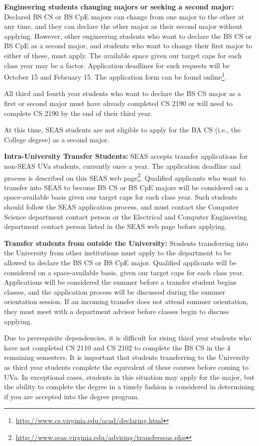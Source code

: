 \documentclass[10pt,letter,twocolumn]{book}
\newcommand{\myurl}[1]{\footnote{\scriptsize\url{#1}}}
\begin{document}
{\bf Engineering students changing majors or seeking a second major:}
Declared BS CS or BS CpE majors can change from one major to the other
at any time, and they can declare the other major as their second
major without applying. However, other engineering students who want
to declare the BS CS or BS CpE as a second major, and students who want
to change their first major to either of these, must apply. The
available space given our target caps for each class year may be a
factor. Application deadlines for such requests will be October 15 and
February 15. The application form can be found
online\myurl{http://www.cs.virginia.edu/acad/declaring.html}.

All third and fourth year students who want to declare the BS CS major
as a first or second major must have already completed CS 2190 or will
need to complete CS 2190 by the end of their third year.

At this time, SEAS students are not eligible to apply for the BA CS
(i.e., the College degree) as a second major.

{\bf Intra-University Transfer Students:} SEAS accepts transfer
app\-li\-ca\-tions for non-SEAS UVa students, currently once a year. The
application deadline and process is described on this SEAS
web page\myurl{http://www.seas.virginia.edu/advising/transferseas.php}.
Qualified applicants who want to transfer into SEAS to become BS CS or
BS CpE majors will be considered on a space-available basis given our
target caps for each class year. Such students should follow the SEAS
application process, and must contact the Computer Science department
contact person or the Electrical and Computer Engineering department
contact person listed in the SEAS web page before applying.

{\bf Transfer students from outside the University:} Students
transferring into the University from other institutions must apply to
the department to be allowed to declare the BS CS or BS CpE major.
Qualified applicants will be considered on a space-available basis,
given our target caps for each class year. Applications will be
considered the summer before a transfer student begins classes, and
the application process will be discussed during the summer
orientation session. If an incoming transfer does not attend summer
orientation, they must meet with a department advisor before classes
begin to discuss applying.

Due to prerequisite dependencies, it is difficult for rising third year
students who have not completed CS 2110 and CS 2102 to complete the
BS CS in the 4 remaining semesters. It is important that students
transferring to the University as third year students complete the equivalent
of these courses before coming to UVa. In exceptional cases, students
in this situation may apply for the major, but the ability to complete
the degree in a timely fashion is considered in determining if
you are accepted into the degree program.
\end{document}
